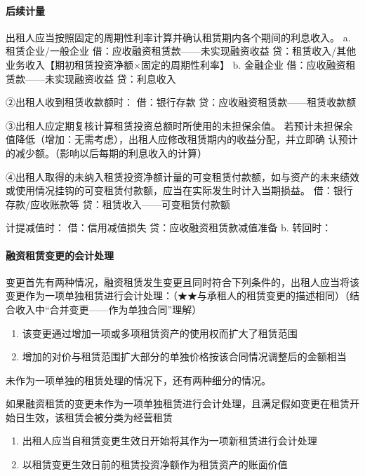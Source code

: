 \documentclass[UTF8,12pt]{ctexart}
\numberwithin{equation}{section} %
\numberwithin{figure}{section}
\numberwithin{table}{section}
\begin{document}
	\paragraph{后续计量}
	出租人应当按照固定的周期性利率计算并确认租赁期内各个期间的利息收入。
	a.	租赁企业/一般企业
	借：应收融资租赁款——未实现融资收益
	贷：租赁收入/其他业务收入【期初租赁投资净额×固定的周期性利率】
	b.	金融企业
	借：应收融资租赁款——未实现融资收益
	贷：利息收入
	
	②出租人收到租赁收款额时： 
	借：银行存款
	贷：应收融资租赁款——租赁收款额
	
	③出租人应定期复核计算租赁投资总额时所使用的未担保余值。
	若预计未担保余值降低（增加：无需考虑），出租人应修改租赁期内的收益分配，并立即确   认预计的减少额。（影响以后每期的利息收入的计算）
	
	④出租人取得的未纳入租赁投资净额计量的可变租赁付款额，如与资产的未来绩效或使用情况挂钩的可变租赁付款额，应当在实际发生时计入当期损益。
	借：银行存款/应收账款等
	贷：租赁收入——可变租赁付款额
	
	计提减值时： 
	借：信用减值损失
	贷：应收融资租赁款减值准备
	b.	转回时： 

	\paragraph{融资租赁变更的会计处理}
	变更首先有两种情况，融资租赁发生变更且同时符合下列条件的，出租人应当将该变更作为一项单独租赁进行会计处理：（★★与承租人的租赁变更的描述相同）（结合收入中“合并变更——作为单独合同”理解）
	\begin{enumerate}
		\item 该变更通过增加一项或多项租赁资产的使用权而扩大了租赁范围
		
		\item 增加的对价与租赁范围扩大部分的单独价格按该合同情况调整后的金额相当
	\end{enumerate}

	未作为一项单独的租赁处理的情况下，还有两种细分的情况。
	
	如果融资租赁的变更未作为一项单独租赁进行会计处理，且满足假如变更在租赁开始日生效，该租赁会被分类为经营租赁
	\begin{enumerate}
		\item 出租人应当自租赁变更生效日开始将其作为一项新租赁进行会计处理

		\item 以租赁变更生效日前的租赁投资净额作为租赁资产的账面价值
	\end{enumerate}
\end{document}
